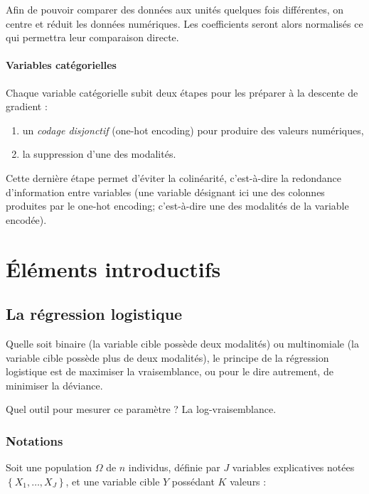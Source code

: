 \documentclass[10pt,french]{report}
\begin{document}
	Afin de pouvoir comparer des données aux unités quelques fois différentes, on centre et réduit les données numériques. Les coefficients seront alors normalisés ce qui permettra leur comparaison directe.

	\subsubsection{Variables catégorielles}

	Chaque variable catégorielle subit deux étapes pour les préparer à la descente de gradient :

	\begin{enumerate}
		\item un \textit{codage disjonctif} (one-hot encoding) pour produire des valeurs numériques,
		\item la suppression d'une des modalités.
	\end{enumerate}

	Cette dernière étape permet d'éviter la colinéarité, c'est-à-dire la redondance d'information entre variables (une variable désignant ici une des colonnes produites par le one-hot encoding; c'est-à-dire une des modalités de la variable encodée).

	\chapter{Éléments introductifs}

	\section{La régression logistique}

	Quelle soit binaire (la variable cible possède deux modalités) ou multinomiale (la variable cible possède plus de deux modalités), le principe de la régression logistique est de maximiser la vraisemblance, ou pour le dire autrement, de minimiser la déviance.

	Quel outil pour mesurer ce paramètre ? La log-vraisemblance.

    \subsection{Notations}

    Soit une population $\Omega$ de $n$ individus, définie par $J$ variables explicatives notées $\left\{X_{1}, \ldots,X_{J}\right\}$, et une variable cible $Y$ possédant $K$ valeurs :
\end{document}
